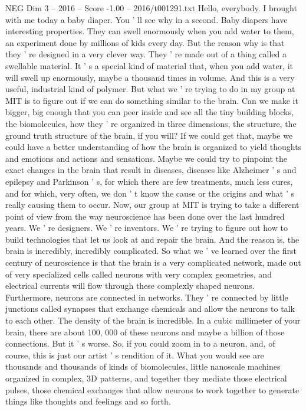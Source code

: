 \begin{textsample}{NEG Dim 3 – 2016 – Score -1.00 – 2016/t001291.txt}  \label{ex:f3_neg_073}
Hello, everybody.
I brought with me today a baby diaper.
You ' ll see why in a second.
Baby diapers have interesting properties.
They can swell enormously when you add water to them, an experiment done by millions of kids every day.
But the reason why is that they ' re designed in a very clever way.
They ' re made out of a thing called a swellable material.
It ' s a special kind of material that, when you add water, it will swell up enormously, maybe a thousand times in volume.
And this is a very useful, industrial kind of polymer.
But what we ' re trying to do in my group at MIT is to figure out if we can do something similar to the brain.
Can we make it bigger, big enough that you can peer inside and see all the tiny building blocks, the biomolecules, how they ' re organized in three dimensions, the structure, the ground truth structure of the brain, if you will?
If we could get that, maybe we could have a better understanding of how the brain is organized to yield thoughts and emotions and actions and sensations.
Maybe we could try to pinpoint the exact changes in the brain that result in diseases, diseases like Alzheimer ' s and epilepsy and Parkinson ' s, for which there are few treatments, much less cures, and for which, very often, we don ' t know the cause or the origins and what ' s really causing them to occur.
Now, our group at MIT is trying to take a different point of view from the way neuroscience has been done over the last hundred years.
We ' re designers.
We ' re inventors.
We ' re trying to figure out how to build technologies that let us look at and repair the brain.
And the reason is, the brain is incredibly, incredibly complicated.
So what we ' ve learned over the first century of neuroscience is that the brain is a very complicated network, made out of very specialized cells called neurons with very complex geometries, and electrical currents will flow through these complexly shaped neurons.
Furthermore, neurons are connected in networks.
They ' re connected by little junctions called synapses that exchange chemicals and allow the neurons to talk to each other.
The density of the brain is incredible.
In a cubic millimeter of your brain, there are about 100, 000 of these neurons and maybe a billion of those connections.
But it ' s worse.
So, if you could zoom in to a neuron, and, of course, this is just our artist ' s rendition of it.
What you would see are thousands and thousands of kinds of biomolecules, little nanoscale machines organized in complex, 3D patterns, and together they mediate those electrical pulses, those chemical exchanges that allow neurons to work together to generate things like thoughts and feelings and so forth.

\end{textsample}
